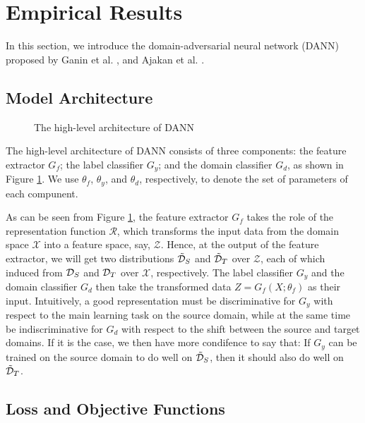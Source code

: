 \section{Empirical Results}\label{sect:dann}
In this section, we introduce the domain-adversarial neural network (DANN) proposed by Ganin et al. \cite{Ganin2016}, \cite{Ganin2015} and Ajakan et al. \cite{Ajakan2014}.

\subsection{Model Architecture}\label{sub:model_arch}
\begin{figure}
  \centering
  
  \caption{The high-level architecture of DANN}
  \label{fig:dann_arch}
\end{figure}

The high-level architecture of DANN consists of three components: the feature extractor $G_f$; the label classifier $G_y$; and the domain classifier $G_d$, as shown in Figure \ref{fig:dann_arch}. We use $\theta_f$, $\theta_y$, and $\theta_d$, respectively, to denote the set of parameters of each compunent.

As can be seen from Figure \ref{fig:dann_arch}, the feature extractor $G_f$ takes the role of the representation function $\mathcal{R}$, which transforms the input data from the domain space $\mathcal{X}$ into a feature space, say, $\mathcal{Z}$. Hence, at the output of the feature extractor, we will get two distributions $\tilde{\mathcal{D}}_S$ and $\tilde{\mathcal{D}}_T$ over $\mathcal{Z}$, each of which induced from $\mathcal{D}_S$ and $\mathcal{D}_T$ over $\mathcal{X}$, respectively. The label classifier $G_y$ and the domain classifier $G_d$ then take the transformed data $Z=G_f(X;\theta_f)$ as their input. Intuitively, a good representation must be discriminative for $G_y$ with respect to the main learning task on the source domain, while at the same time be indiscriminative for $G_d$ with respect to the shift between the source and target domains. If it is the case, we then have more condifence to say that: If $G_y$ can be trained on the source domain to do well on $\tilde{\mathcal{D}}_S$, then it should also do well on $\tilde{\mathcal{D}}_T$.

\subsection{Loss and Objective Functions}

